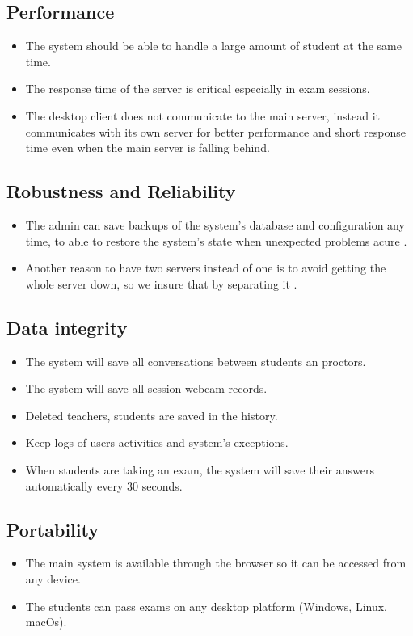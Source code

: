 \documentclass[]{uc2pfecaneva}
\begin{document}
    \raggedright\subsection{Performance}
    \begin{itemize}
        \item The system should be able to handle a large amount of student at the same time.
        \item The response time of the server is critical especially in exam sessions.
        \item The desktop client does not communicate to the main server, instead it communicates with its own server for better performance and short response time even when the main server is falling behind.
    \end{itemize}

    \raggedright\subsection{Robustness and Reliability}
    \begin{itemize}
        \item The admin can save backups of the system’s database and configuration any time, to able to restore the system’s state when  unexpected problems acure .
        \item Another reason to have two servers instead of one is to avoid getting the whole server down, so we insure that by separating it .
    \end{itemize}

    \raggedright\subsection{Data integrity}
    \begin{itemize}
        \item The system will save all conversations between students an proctors.
        \item The system will save all session webcam records.
        \item Deleted teachers, students are saved in the history.
        \item Keep logs of users activities and system’s exceptions.
        \item When students are taking an exam, the system will save their answers automatically every 30 seconds.
    \end{itemize}

    \raggedright\subsection{Portability}
    \begin{itemize}
        \item The main system is available through the browser so it can be accessed from any device.
        \item The students can pass exams on any desktop platform (Windows, Linux, macOs).
    \end{itemize}
\end{document}
